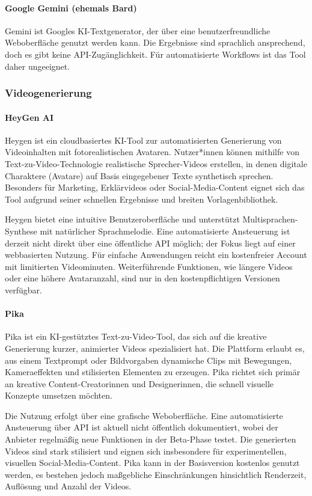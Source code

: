 \documentclass[a4paper,12pt]{article}
\begin{document}
\paragraph{Google Gemini (ehemals Bard)}
Gemini ist Googles KI-Textgenerator, der über eine benutzerfreundliche Weboberfläche genutzt werden kann. Die Ergebnisse sind sprachlich ansprechend, doch es gibt keine API-Zugänglichkeit. Für automatisierte Workflows ist das Tool daher ungeeignet.

\subsubsection{Videogenerierung}

\paragraph{HeyGen AI}
Heygen ist ein cloudbasiertes KI-Tool zur automatisierten Generierung von Videoinhalten mit fotorealistischen Avataren. Nutzer*innen können mithilfe von Text-zu-Video-Technologie realistische Sprecher-Videos erstellen, in denen digitale Charaktere (Avatare) auf Basis eingegebener Texte synthetisch sprechen. Besonders für Marketing, Erklärvideos oder Social-Media-Content eignet sich das Tool aufgrund seiner schnellen Ergebnisse und breiten Vorlagenbibliothek.

Heygen bietet eine intuitive Benutzeroberfläche und unterstützt Multisprachen-Synthese mit natürlicher Sprachmelodie. Eine automatisierte Ansteuerung ist derzeit nicht direkt über eine öffentliche API möglich; der Fokus liegt auf einer webbasierten Nutzung. Für einfache Anwendungen reicht ein kostenfreier Account mit limitierten Videominuten. Weiterführende Funktionen, wie längere Videos oder eine höhere Avataranzahl, sind nur in den kostenpflichtigen Versionen verfügbar.

\paragraph{Pika}
Pika ist ein KI-gestütztes Text-zu-Video-Tool, das sich auf die kreative Generierung kurzer, animierter Videos spezialisiert hat. Die Plattform erlaubt es, aus einem Textprompt oder Bildvorgaben dynamische Clips mit Bewegungen, Kameraeffekten und stilisierten Elementen zu erzeugen. Pika richtet sich primär an kreative Content-Creatorinnen und Designerinnen, die schnell visuelle Konzepte umsetzen möchten.

Die Nutzung erfolgt über eine grafische Weboberfläche. Eine automatisierte Ansteuerung über API ist aktuell nicht öffentlich dokumentiert, wobei der Anbieter regelmäßig neue Funktionen in der Beta-Phase testet. Die generierten Videos sind stark stilisiert und eignen sich insbesondere für experimentellen, visuellen Social-Media-Content. Pika kann in der Basisversion kostenlos genutzt werden, es bestehen jedoch maßgebliche Einschränkungen hinsichtlich Renderzeit, Auflösung und Anzahl der Videos.
\end{document}
